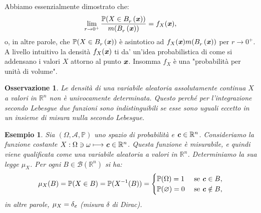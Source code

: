 \documentclass[11pt]{book}
\theoremstyle{Definizione}
\theoremstyle{TeoremaProposizioneLemmaCorollario}
\theoremstyle{OsservazioneNota}
\newtheorem{myobs}{Osservazione}[section]
\newtheorem{myes}{Esempio}[section]
\newcommand{\R}{\mathbb{R}}
\newcommand{\Ball}[3][]{B^{#1}_{{#2}}\left({#3}\right)}
\newcommand{\gri}[1]{\textbf{\textit{{#1}}}}
\renewcommand{\P}{\mathbb{P}}
\begin{document}
Abbiamo essenzialmente dimostrato che:
$$
\lim_{r \to 0^+} \frac{\P(X\in \Ball{r}{\gri{x}})}{m(\Ball{r}{\gri{x}})} = f_X(\gri{x}),
$$
o, in altre parole, che $\P(X\in \Ball{r}{\gri{x}})$ è asintotico ad $f_X(\gri{x})m(\Ball{r}{\gri{x}})$ per $r \to 0^+$.\\
A livello intuitivo la densità $f_X(\gri{x})$ ti da' un'idea probabilistica di come si addensano i valori $X$ attorno al punto $\gri{x}$. Insomma $f_X$ è una "probabilità per unità di volume".
\begin{myobs}
Le densità di una variabile aleatoria assolutamente continua $X$ a valori in $\R^n$ non è univocamente determinata. Questo perché per l'integrazione secondo Lebesgue due funzioni  sono indistinguibili se esse sono uguali eccetto in un insieme di misura nulla secondo Lebesgue.
\end{myobs}
\begin{myes}
Sia $(\Omega,\mathcal{A},\P)$ uno spazio di probabilità e $\gri{c}\in \R^n$. Consideriamo la funzione costante $X:\Omega\ni \omega \longmapsto \gri{c}\in \R^n$. Questa funzione è misurabile, e quindi viene qualificata come una variabile aleatoria a valori in $\R^n$. Determiniamo la sua legge $\mu_X$. Per ogni $B\in \mathcal{B}(\R^n)$ si ha:
$$
\mu_X(B) = \P(X\in B) = \P(X^{-1}(B)) = \begin{cases}
\P(\Omega) = 1 &\textup{ se }\gri{c}\in B,\\
\P(\varnothing) = 0 &\textup{ se }\gri{c}\notin B,
\end{cases}
$$
in altre parole, $\mu_X = \delta_{\gri{c}}$ (misura $\delta$ di Dirac).
\end{myes}
\end{document}
